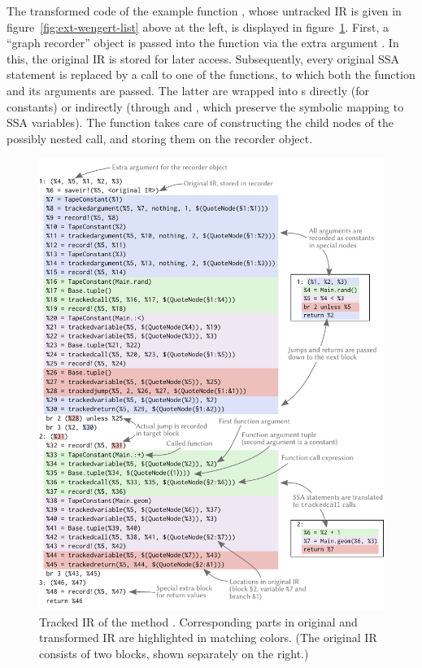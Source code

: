 The transformed code of the example function , whose untracked IR is given in
figure~\ref{fig:ext-wengert-list} above at the left, is displayed in figure~\ref{fig:geom-tracked}.
First, a \enquote{graph recorder} object is passed into the function via the extra argument
.  In this, the original IR is stored for later access.  Subsequently, every original SSA
statement is replaced by a call to one of the \protect{} functions, to which both the
function and its arguments are passed.  The latter are wrapped into s directly
(for constants) or indirectly (through  and , which
preserve the symbolic mapping to SSA variables).  The   function takes care of
constructing the child nodes of the possibly nested call, and storing them on the recorder object.

\begin{figure}[p]
  \includegraphics[width=\textwidth]{figures/translation}
  \caption{Tracked IR of the method \protect{}.  Corresponding parts in
    original and transformed IR are highlighted in matching colors.  (The original IR consists of
    two blocks, shown separately on the right.)\label{fig:geom-tracked}}
\end{figure}

